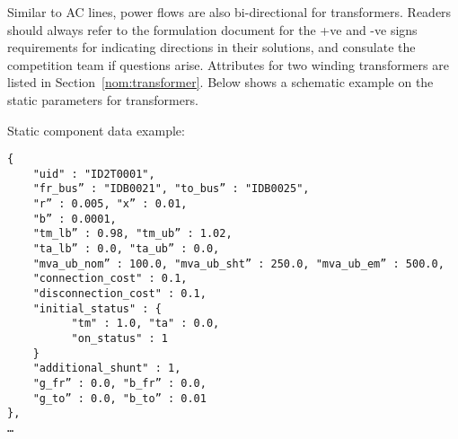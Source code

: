 Similar to AC lines, power flows are also bi-directional for transformers. 
Readers should always refer to the formulation document for the +ve and -ve signs
requirements for indicating directions in their solutions,
and consulate the competition team if questions arise.
Attributes for two winding transformers are listed in Section~\ref{nom:transformer}.
Below shows a schematic example on the static parameters for transformers.

Static component data example:
\begin{verbatim}
{
    "uid" : "ID2T0001",
    "fr_bus” : "IDB0021", "to_bus” : "IDB0025",
    "r” : 0.005, "x” : 0.01, 
    "b” : 0.0001,
    "tm_lb” : 0.98, "tm_ub” : 1.02, 
    "ta_lb” : 0.0, "ta_ub” : 0.0, 
    "mva_ub_nom” : 100.0, "mva_ub_sht” : 250.0, "mva_ub_em” : 500.0,
    "connection_cost" : 0.1,
    "disconnection_cost" : 0.1,
    "initial_status" : {
          "tm" : 1.0, "ta" : 0.0,
          "on_status" : 1
    }
    "additional_shunt" : 1,
    "g_fr” : 0.0, "b_fr” : 0.0,
    "g_to” : 0.0, "b_to” : 0.01    
},
…     
\end{verbatim}



